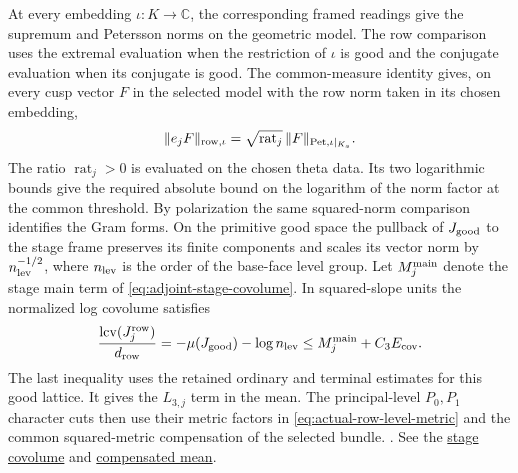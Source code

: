 At every embedding \(\iota:K\to\mathbb C\), the corresponding
framed readings give the supremum and Petersson norms on the
geometric model. The row comparison uses the extremal evaluation
when the restriction of \(\iota\) is good and the conjugate evaluation
when its conjugate is good. The common-measure identity gives, on
every cusp vector \(F\) in the selected model with the row norm taken
in its chosen embedding,
\[
 \|e_j F\|_{{\rm row},\iota}
    =\sqrt{\operatorname{rat}_j}\,\|F\|_{{\rm Pet},\iota|_{K_s}}.
\]
The ratio \(\operatorname{rat}_j>0\) is evaluated on the chosen theta
data. Its two logarithmic bounds give the required absolute bound on
the logarithm of the norm factor at the common threshold. By polarization
the same squared-norm comparison identifies the Gram forms. On the
primitive good space the pullback of \(J_{\rm good}\) to the stage
frame preserves its finite components and scales its vector norm by
\(n_{\rm lev}^{-1/2}\), where \(n_{\rm lev}\) is the order of the
base-face level group. Let \(M_j^{\rm main}\) denote the stage main
term of \eqref{eq:adjoint-stage-covolume}. In squared-slope units the
normalized log covolume satisfies
\[
 \frac{\operatorname{lcv}(J_j^{\rm row})}{d_{\rm row}}
     =-\mu(J_{\rm good})-\log n_{\rm lev}
     \le M_j^{\rm main}+C_3E_{\rm cov} .
\]
The last inequality uses the retained ordinary and terminal estimates
for this good lattice. It gives the \(L_{3,j}\) term in the mean.
The principal-level \(P_0,P_1\) character cuts then use their metric factors in
\eqref{eq:actual-row-level-metric} and the common squared-metric
compensation of the selected bundle.
.
See the \hyperlink{proof.absolute-stage-row-covolume}{stage covolume}
and \hyperlink{proof.row-level-mean}{compensated mean}.

